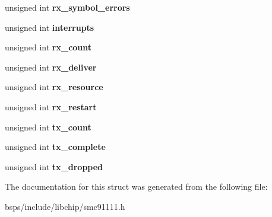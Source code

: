 \begin{DoxyCompactItemize}
unsigned int {\bfseries rx\+\_\+symbol\+\_\+errors}
\item 
\mbox{\label{structsmsc__lan91cxx__stats_aad0b09d557ba56424e74381e075a48b5}} 
unsigned int {\bfseries interrupts}
\item 
\mbox{\label{structsmsc__lan91cxx__stats_aba8bd396ca26b9d9625511ef4d4cec16}} 
unsigned int {\bfseries rx\+\_\+count}
\item 
\mbox{\label{structsmsc__lan91cxx__stats_aa3c200b379a1f52c6f00c9ace7c5d019}} 
unsigned int {\bfseries rx\+\_\+deliver}
\item 
\mbox{\label{structsmsc__lan91cxx__stats_a2880374d45b4465270ddedeb058370ff}} 
unsigned int {\bfseries rx\+\_\+resource}
\item 
\mbox{\label{structsmsc__lan91cxx__stats_a2884c51a0b88fa85640087265eac7148}} 
unsigned int {\bfseries rx\+\_\+restart}
\item 
\mbox{\label{structsmsc__lan91cxx__stats_a307d95a25baf0e38865313156ca51549}} 
unsigned int {\bfseries tx\+\_\+count}
\item 
\mbox{\label{structsmsc__lan91cxx__stats_acd9f10b96af6eb4f48444081be9c0774}} 
unsigned int {\bfseries tx\+\_\+complete}
\item 
\mbox{\label{structsmsc__lan91cxx__stats_a7517537c09ea144de0a2d9b38b769b1a}} 
unsigned int {\bfseries tx\+\_\+dropped}
\end{DoxyCompactItemize}


The documentation for this struct was generated from the following file\+:\begin{DoxyCompactItemize}
\item 
bsps/include/libchip/smc91111.\+h\end{DoxyCompactItemize}
